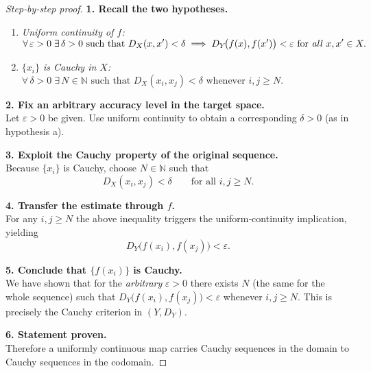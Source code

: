 \documentclass[12pt]{article}
\theoremstyle{definition} %
\theoremstyle{plain} %
\begin{document}
\begin{proof}[Step‑by‑step proof]
  \textbf{1.  Recall the two hypotheses.}
  \begin{enumerate}[label=\alph*., wide, labelwidth=!, labelindent=0pt]
      \item \emph{Uniform continuity of $f$:}\\[2pt]
            $\displaystyle
            \forall\,\varepsilon>0\;\exists\,\delta>0
            \text{ such that }
            D_X(x,x')<\delta
            \;\Longrightarrow\;
            D_Y\!\bigl(f(x),f(x')\bigr)<\varepsilon
            \text{ for \emph{all} }x,x'\in X.$
      \item \emph{$\{x_i\}$ is Cauchy in $X$:}\\[2pt]
            $\displaystyle
            \forall\,\delta>0\;\exists\,N\in\mathbb N
            \text{ such that }
            D_X(x_i,x_j)<\delta
            \text{ whenever }i,j\ge N.$
  \end{enumerate}

  \medskip
  \textbf{2.  Fix an arbitrary accuracy level in the target space.}\\
  Let $\varepsilon>0$ be given.  
  Use uniform continuity to obtain a corresponding $\delta>0$
  (as in hypothesis a).

  \medskip
  \textbf{3.  Exploit the Cauchy property of the original sequence.}\\
  Because $\{x_i\}$ is Cauchy, choose $N\in\mathbb N$ such that  
  \[
      D_X(x_i,x_j)<\delta
      \qquad\text{for all }i,j\ge N.
  \]

  \medskip
  \textbf{4.  Transfer the estimate through $f$.}\\
  For any $i,j\ge N$ the above inequality triggers the
  uniform‑continuity implication, yielding
  \[
      D_Y\!\bigl(f(x_i),f(x_j)\bigr)<\varepsilon.
  \]

  \medskip
  \textbf{5.  Conclude that $\{f(x_i)\}$ is Cauchy.}\\
  We have shown that for the \emph{arbitrary} $\varepsilon>0$
  there exists $N$ (the same for the whole sequence) such that
  $D_Y\!\bigl(f(x_i),f(x_j)\bigr)<\varepsilon$ whenever $i,j\ge N$.
  This is precisely the Cauchy criterion in $(Y,D_Y)$.

  \medskip
  \textbf{6.  Statement proven.}\\
  Therefore a uniformly continuous map carries Cauchy sequences
  in the domain to Cauchy sequences in the codomain.
\end{proof}
\end{document}
